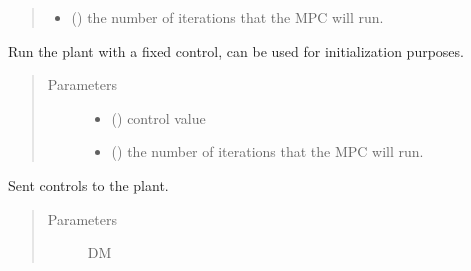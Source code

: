\documentclass[letterpaper,10pt,english]{sphinxmanual}
\begin{document}
\begin{fulllineitems}
\begin{fulllineitems}
\begin{quote}
\begin{description}
\begin{itemize}
\item {} 
 () \textendash{} the number of iterations that the MPC will run.

\end{itemize}

\end{description}\end{quote}

\end{fulllineitems}


\begin{fulllineitems}
\label{\detokenize{yaocptool.mpc:yaocptool.mpc.mpc.MPC.run_fixed_control_with_estimator}}
Run the plant with a fixed control, can be used for initialization purposes.
\begin{quote}\begin{description}
\item[{Parameters}] \leavevmode\begin{itemize}
\item {} 
 () \textendash{} control value

\item {} 
 () \textendash{} the number of iterations that the MPC will run.

\end{itemize}

\end{description}\end{quote}

\end{fulllineitems}


\begin{fulllineitems}
\label{\detokenize{yaocptool.mpc:yaocptool.mpc.mpc.MPC.send_control}}
Sent controls to the plant.
\begin{quote}\begin{description}
\item[{Parameters}] \leavevmode
{} \textendash{} DM

\end{description}\end{quote}

\end{fulllineitems}


\end{fulllineitems}
\end{document}
